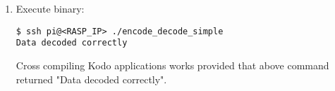\begin{enumerate}
\item Execute binary:
\begin{lstlisting}[]
$ ssh pi@<RASP_IP> ./encode_decode_simple
Data decoded correctly
\end{lstlisting}
\FloatBarrier
\vspace{-5mm}

Cross compiling Kodo applications works provided that above command
returned "Data decoded correctly".

%
%
%


\end{enumerate}

%

